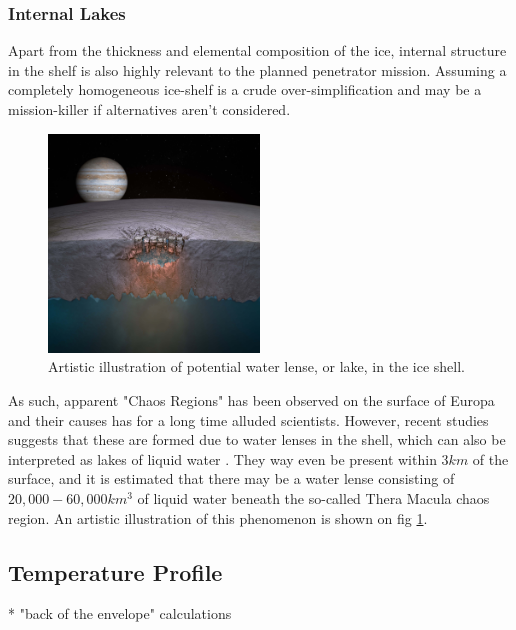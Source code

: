 \subsubsection{Internal Lakes}
Apart from the thickness and elemental composition of the ice, internal structure in the shelf is also highly relevant to the planned penetrator mission. Assuming a completely homogeneous ice-shelf is a crude over-simplification and may be a mission-killer if alternatives aren't considered. 
\begin{figure}[htb]
	\centering
	\includegraphics[width=0.5\textwidth]{figures/Rasmus/ArtLake}
	\caption{Artistic illustration of potential water lense, or lake, in the ice shell. \label{fig: ArtLake}}
\end{figure}
As such, apparent "Chaos Regions" has been observed on the surface of Europa and their causes has for a long time alluded scientists. However, recent studies suggests that these are formed due to water lenses in the shell, which can also be interpreted as lakes of liquid water \cite{IceLakes}. They way even be present within $3km$ of the surface, and it is estimated that there may be a water lense consisting of $20,000 - 60,000km^3$ of liquid water beneath the so-called Thera Macula chaos region. An artistic illustration of this phenomenon is shown on fig \ref{fig: ArtLake}.

\subsection{Temperature Profile}

* "back of the envelope" calculations

